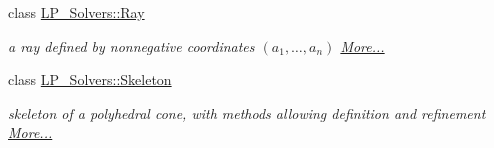 \begin{DoxyCompactItemize}
class \hyperlink{group___c_l_s_solvers_class_l_p___solvers_1_1_ray}{L\+P\+\_\+\+Solvers\+::\+Ray}
\begin{DoxyCompactList}\small\item\em a ray defined by nonnegative coordinates $(a_1,\ldots,a_n)$  \hyperlink{group___c_l_s_solvers_class_l_p___solvers_1_1_ray}{More...}\end{DoxyCompactList}\item 
class \hyperlink{group___c_l_s_solvers_class_l_p___solvers_1_1_skeleton}{L\+P\+\_\+\+Solvers\+::\+Skeleton}
\begin{DoxyCompactList}\small\item\em skeleton of a polyhedral cone, with methods allowing definition and refinement  \hyperlink{group___c_l_s_solvers_class_l_p___solvers_1_1_skeleton}{More...}\end{DoxyCompactList}\end{DoxyCompactItemize}
